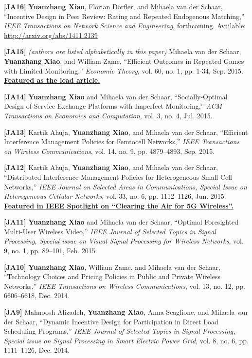 \documentclass[margin,line]{res}
\begin{document}
\begin{resume}
\textbf{[JA16]} {\bf Yuanzhang Xiao}, Florian D\"{o}rfler, and Mihaela van der Schaar, ``Incentive Design in Peer Review: Rating and Repeated Endogenous Matching,'' \emph{IEEE Transactions on Network Science and Engineering}, forthcoming. Available: \url{http://arxiv.org/abs/1411.2139}

\textbf{[JA15]} \emph{(authors are listed alphabetically in this paper)} Mihaela van der Schaar, {\bf Yuanzhang Xiao}, and William Zame, ``Efficient Outcomes in Repeated Games with Limited Monitoring,'' \emph{Economic Theory}, vol. 60, no. 1, pp. 1-34, Sep. 2015.
\href{http://link.springer.com/journal/199/60/1/page/1}{\textbf{Featured as the lead article.}}

\textbf{[JA14]} {\bf Yuanzhang Xiao} and Mihaela van der Schaar, ``Socially-Optimal Design of Service Exchange Platforms with Imperfect Monitoring,''
\emph{ACM Transactions on Economics and Computation}, vol. 3, no. 4, Jul. 2015.

\textbf{[JA13]} Kartik Ahuja, {\bf Yuanzhang Xiao}, and Mihaela van der Schaar, ``Efficient Interference Management Policies for Femtocell Networks,'' \emph{IEEE Transactions on Wireless Communications}, vol. 14, no. 9, pp. 4879--4893, Sep. 2015.

\textbf{[JA12]} Kartik Ahuja, {\bf Yuanzhang Xiao}, and Mihaela van der Schaar, ``Distributed Interference Management Policies for Heterogeneous Small Cell Networks,'' \emph{IEEE Journal on Selected Areas in Communications, Special Issue on Heterogeneous Cellular Networks}, vol. 33, no. 6, pp. 1112--1126, Jun. 2015. 
\href{http://ieeexplore-spotlight.ieee.org/article/clearing-the-air-for-5g-wireless/?utm_source=Xplore&utm_medium=referreral&utm_content=clearair5g&utm_campaign=xplorehighlight}{\textbf{Featured in IEEE Spotlight on ``Clearing the Air for 5G Wireless''.}}

\textbf{[JA11]} {\bf Yuanzhang Xiao} and Mihaela van der Schaar, ``Optimal Foresighted Multi-User Wireless Video,'' \emph{IEEE Journal of Selected Topics in Signal Processing, Special issue on Visual Signal Processing for Wireless Networks}, vol. 9, no. 1, pp. 89--101, Feb. 2015. 

\textbf{[JA10]} {\bf Yuanzhang Xiao}, William Zame, and Mihaela van der Schaar, ``Technology Choices and Pricing Policies in Public and Private Wireless Networks,''  {\em IEEE Transactions on Wireless Communications}, vol. 13, no. 12, pp. 6606--6618, Dec. 2014.

\textbf{[JA9]} Mahnoosh Alizadeh, {\bf Yuanzhang Xiao}, Anna Scaglione, and Mihaela van der Schaar, ``Dynamic Incentive Design for Participation in Direct Load Scheduling Programs,'' \emph{IEEE Journal of Selected Topics in Signal Processing, Special issue on Signal Processing in Smart Electric Power Grid}, vol. 8, no. 6, pp. 1111--1126, Dec. 2014.


\end{resume}
\end{document}
